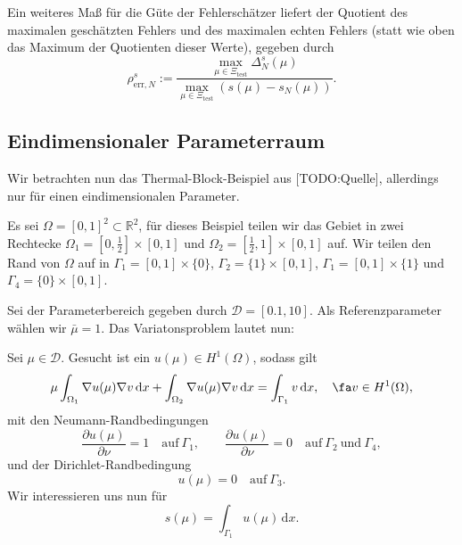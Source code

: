 Ein weiteres Maß für die Güte der Fehlerschätzer liefert der Quotient des maximalen geschätzten Fehlers und des maximalen echten Fehlers (statt wie oben das Maximum der Quotienten dieser Werte), gegeben durch
\begin{equation}
     \rho^s_{\text{err},N} := \frac{\max\limits_{\mu \in \Xi_\text{test}} \Delta_N^s(\mu)}{\max\limits_{\mu \in \Xi_\text{test}} (s(\mu) - s_N(\mu))}.
\end{equation}


\subsection{Eindimensionaler Parameterraum} %
\label{sub:eindimensionaler_parameterraum}


Wir betrachten nun das Thermal-Block-Beispiel aus [TODO:Quelle], allerdings nur für einen eindimensionalen Parameter.

Es sei $\Omega = [ 0, 1 ]^2 \subset \mathbb{R}^2$, für dieses Beispiel teilen wir das Gebiet in zwei Rechtecke $\Omega_1 = [0, \frac{1}{2}] \times [ 0, 1 ] $ und $\Omega_2 = [ \frac{1}{2}, 1 ] \times [ 0, 1 ]$ auf. Wir teilen den Rand von $\Omega$ auf in $\Gamma_1 = [0, 1] \times \{ 0 \}$, $\Gamma_2 = \{ 1 \} \times [0, 1]$, $\Gamma_1 = [0, 1] \times \{ 1 \}$ und $\Gamma_4 = \{ 0 \} \times [0, 1]$.

Sei der Parameterbereich gegeben durch $\mathcal D = [0.1, 10]$. Als Referenzparameter wählen wir $\bar \mu = 1$.
Das Variatonsproblem lautet nun:
\begin{addmargin}[2em]{2em}
Sei $\mu \in \mathcal D$. Gesucht ist ein $u(\mu) \in H^1(\Omega)$, sodass gilt
\begin{equation}
    \mu \int_{\Omega_1} \nabla u(\mu) \nabla v \, \mathrm d x + \int_{\Omega_2} \nabla u(\mu) \nabla v \, \mathrm d x = \int_{\Gamma_1} v \, \mathrm{d} x, \quad \fa v \in H^1(\Omega),
\end{equation}
mit den Neumann-Randbedingungen
\begin{equation}
    \frac{\partial u(\mu)}{\partial \nu} = 1
    \quad \text{auf}~ \Gamma_1,
    \qquad
    \frac{\partial u(\mu)}{\partial \nu} = 0
    \quad \text{auf} ~ \Gamma_2 ~\text{und}~ \Gamma_4,
\end{equation}
und der Dirichlet-Randbedingung
\begin{equation}
    u(\mu) = 0 \quad \text{auf} ~\Gamma_3.
\end{equation}
Wir interessieren uns nun für
\begin{equation}
    s(\mu) = \int_{\Gamma_1} u(\mu) \, \mathrm{d}x.
\end{equation}
\end{addmargin}

